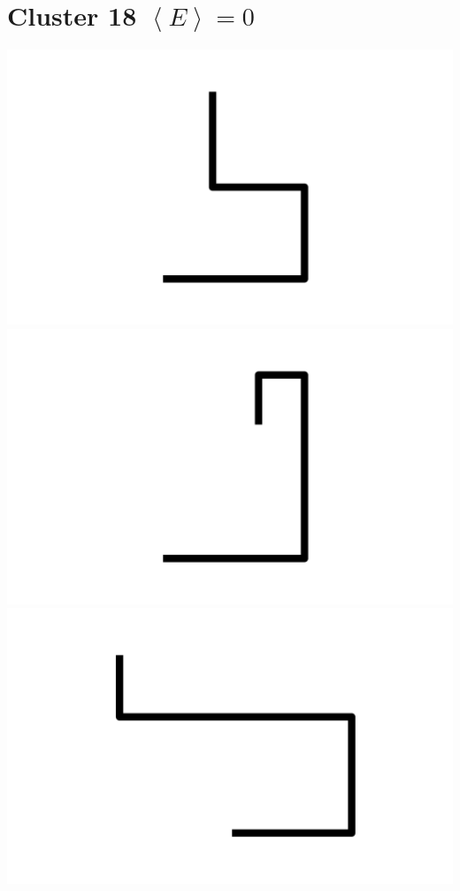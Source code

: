 \documentclass[]{report}
\begin{document}
\section{Cluster 18 $\left < E \right > = 0$} 
\includegraphics[scale=.1]{pictures/18/state_cluster_shapes_0.pdf} 
\includegraphics[scale=.1]{pictures/18/state_cluster_shapes_1.pdf} 
\includegraphics[scale=.1]{pictures/18/state_cluster_shapes_2.pdf} 
\end{document}
